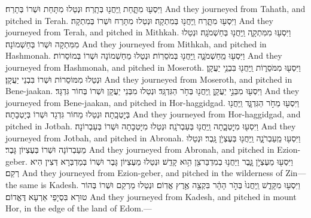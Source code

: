 {וַיִּסְע֖וּ מִתָּ֑חַת וַֽיַּחֲנ֖וּ בְּתָֽרַח׃}
{וּנְטַלוּ מִתָּחַת וּשְׁרוֹ בְּתָרַח׃}
{And they journeyed from Tahath, and pitched in Terah.}{}
{וַיִּסְע֖וּ מִתָּ֑רַח וַֽיַּחֲנ֖וּ בְּמִתְקָֽה׃}
{וּנְטַלוּ מִתָּרַח וּשְׁרוֹ בְּמִתְקָה׃}
{And they journeyed from Terah, and pitched in Mithkah.}{}
{וַיִּסְע֖וּ מִמִּתְקָ֑ה וַֽיַּחֲנ֖וּ בְּחַשְׁמֹנָֽה׃}
{וּנְטַלוּ מִמִּתְקָה וּשְׁרוֹ בְּחַשְׁמוֹנָה׃}
{And they journeyed from Mithkah, and pitched in Hashmonah.}{}
{וַיִּסְע֖וּ מֵֽחַשְׁמֹנָ֑ה וַֽיַּחֲנ֖וּ בְּמֹסֵרֽוֹת׃}
{וּנְטַלוּ מֵחַשְׁמוֹנָה וּשְׁרוֹ בְּמוֹסֵרוֹת׃}
{And they journeyed from Hashmonah, and pitched in Moseroth.}{}
{וַיִּסְע֖וּ מִמֹּסֵר֑וֹת וַֽיַּחֲנ֖וּ בִּבְנֵ֥י יַעֲקָֽן׃}
{וּנְטַלוּ מִמּוֹסֵרוֹת וּשְׁרוֹ בִּבְנֵי יַעֲקָן׃}
{And they journeyed from Moseroth, and pitched in Bene-jaakan.}{}
{וַיִּסְע֖וּ מִבְּנֵ֣י יַעֲקָ֑ן וַֽיַּחֲנ֖וּ בְּחֹ֥ר הַגִּדְגָּֽד׃}
{וּנְטַלוּ מִבְּנֵי יַעֲקָן וּשְׁרוֹ בְּחוֹר גִּדְגָּד׃}
{And they journeyed from Bene-jaakan, and pitched in Hor-haggidgad.}{}
{וַיִּסְע֖וּ מֵחֹ֣ר הַגִּדְגָּ֑ד וַֽיַּחֲנ֖וּ בְּיׇטְבָֽתָה׃}
{וּנְטַלוּ מֵחוֹר גִּדְגָד וּשְׁרוֹ בְּיָטְבָתָה׃}
{And they journeyed from Hor-haggidgad, and pitched in Jotbah.}{}
{וַיִּסְע֖וּ מִיׇּטְבָ֑תָה וַֽיַּחֲנ֖וּ בְּעַבְרֹנָֽה׃}
{וּנְטַלוּ מִיָּטְבָתָה וּשְׁרוֹ בְּעַבְרוֹנָה׃}
{And they journeyed from Jotbah, and pitched in Abronah.}{}
{וַיִּסְע֖וּ מֵֽעַבְרֹנָ֑ה וַֽיַּחֲנ֖וּ בְּעֶצְיֹ֥ן גָּֽבֶר׃}
{וּנְטַלוּ מֵעַבְרוֹנָה וּשְׁרוֹ בְּעֶצְיוֹן גָּבֶר׃}
{And they journeyed from Abronah, and pitched in Ezion-geber.}{}
{וַיִּסְע֖וּ מֵעֶצְיֹ֣ן גָּ֑בֶר וַיַּחֲנ֥וּ בְמִדְבַּר\maqqaf צִ֖ן הִ֥וא קָדֵֽשׁ׃}
{וּנְטַלוּ מֵעֶצְיוֹן גָּבֶר וּשְׁרוֹ בְּמַדְבְּרָא דְּצִין הִיא רְקַם׃}
{And they journeyed from Ezion-geber, and pitched in the wilderness of Zin—the same is Kadesh.}{}
{וַיִּסְע֖וּ מִקָּדֵ֑שׁ וַֽיַּחֲנוּ֙ בְּהֹ֣ר הָהָ֔ר בִּקְצֵ֖ה אֶ֥רֶץ אֱדֽוֹם׃}
{וּנְטַלוּ מֵרְקַם וּשְׁרוֹ בְּהוֹר טוּרָא בִּסְיָפֵי אַרְעָא דֶּאֱדוֹם׃}
{And they journeyed from Kadesh, and pitched in mount Hor, in the edge of the land of Edom.—}{}
